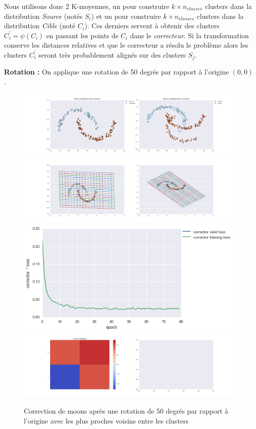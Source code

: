 Nous utilisons donc 2 K-moyennes, un pour construire $k\times n_{classes}$ clusters 
dans la distribution \emph{Source} (notés $S_i$) et un pour construire $k\times n_{classes}$ 
clusters dans la distribution \emph{Cible} (noté $C_i$). Ces derniers servent à obtenir 
des clusters $C_i^\prime = \psi(C_i)$ en passant les points de $C_i$ dans le \emph{correcteur}.
Si la transformation conserve les distances relatives et que le correcteur a résolu le problème
alors les clusters $C_i^\prime$ seront très probablement alignés sur des clusters $S_j$.


{\Large \textbf{Rotation :}} On applique une rotation de 50 degrés par rapport à l'origine $(0,0)$.

\begin{figure}[H] %
\centering
\includegraphics[width=\linewidth]{fig/24-05-2016/moons/Moons_RotatedCluster_Corrector-DATA.png}
\includegraphics[width=\linewidth]{fig/24-05-2016/moons/Moons_RotatedCluster_Corrector-GridCheck.png}
\includegraphics[width=0.45\linewidth]{fig/24-05-2016/moons/Moons_RotatedCluster_Corrector-Learning_curve.png}
\includegraphics[width=\linewidth]{fig/24-05-2016/moons/Moons_RotatedCluster_Corrector-W.png}
\caption{Correction de moons après une rotation de 50 degrés par rapport à l'origine avec les plus proches voisins entre les clusters}
\label{fig:recap-moons-rot-cluster}
\end{figure}


